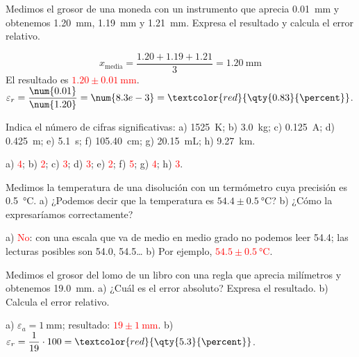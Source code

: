 \begin{example}
    Medimos el grosor de una moneda con un instrumento que aprecia \qty{0.01}{\mm} y obtenemos \qty{1.20}{\mm}, \qty{1.19}{\mm} y \qty{1.21}{\mm}. Expresa el resultado y calcula el error relativo.

    \[ x_\text{media} = \frac{\num{1.20} + \num{1.19} + \num{1.21}}{3} = \qty{1.20}{\mm} \]
    El resultado es \textcolor{red}{\(\num{1.20} \pm \qty{0.01}{\mm}\)}.
    \(\varepsilon_r = \dfrac{\num{0.01}}{\num{1.20}} = \num{8.3e-3} = \textcolor{red}{\qty{0.83}{\percent}}\).
\end{example}

\begin{exercise}
    Indica el número de cifras significativas: a) \qty{1525}{\kelvin}; b) \qty{3.0}{\kg}; c) \qty{0.125}{\ampere}; d) \qty{0.425}{\m}; e) \qty{5.1}{\s}; f) \qty{105.40}{\cm}; g) \qty{20.15}{\mL}; h) \qty{9.27}{\km}.
    \begin{solu}
        a) \textcolor{red}{4}; b) \textcolor{red}{2}; c) \textcolor{red}{3}; d) \textcolor{red}{3}; e) \textcolor{red}{2}; f) \textcolor{red}{5}; g) \textcolor{red}{4}; h) \textcolor{red}{3}.
    \end{solu}
\end{exercise}

\begin{exercise}
    Medimos la temperatura de una disolución con un termómetro cuya precisión es \qty{0.5}{\degreeCelsius}. a) ¿Podemos decir que la temperatura es \(\num{54.4} \pm \qty{0.5}{\degreeCelsius}\)? b) ¿Cómo la expresaríamos correctamente?
    \begin{solu}
        a) \textcolor{red}{No}: con una escala que va de medio en medio grado no podemos leer \num{54.4}; las lecturas posibles son \num{54.0}, \num{54.5}\ldots{} b) Por ejemplo, \textcolor{red}{\(\num{54.5} \pm \qty{0.5}{\degreeCelsius}\)}.
    \end{solu}
\end{exercise}

\begin{exercise}
    Medimos el grosor del lomo de un libro con una regla que aprecia milímetros y obtenemos \qty{19.0}{\mm}. a) ¿Cuál es el error absoluto? Expresa el resultado. b) Calcula el error relativo.
    \begin{solu}
        a) \(\varepsilon_a = \qty{1}{\mm}\); resultado: \textcolor{red}{\(19 \pm \qty{1}{\mm}\)}. b) \(\varepsilon_r = \dfrac{1}{19} \cdot 100 = \textcolor{red}{\qty{5.3}{\percent}}\).
    \end{solu}
\end{exercise}

